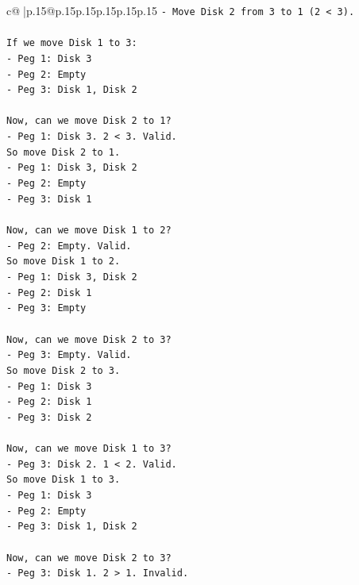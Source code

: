 \documentclass{article}
\begin{document}
{\begin{supertabular}{c@{$\;$}|p{.15\linewidth}@{}p{.15\linewidth}p{.15\linewidth}p{.15\linewidth}p{.15\linewidth}p{.15\linewidth}}
{{{\texttt{{-} Move Disk 2 from 3 to 1 (2 < 3).} \\
\\ 
\texttt{If we move Disk 1 to 3:} \\
\texttt{{-} Peg 1: Disk 3} \\
\texttt{{-} Peg 2: Empty} \\
\texttt{{-} Peg 3: Disk 1, Disk 2} \\
\\ 
\texttt{Now, can we move Disk 2 to 1?} \\
\texttt{{-} Peg 1: Disk 3. 2 < 3. Valid.} \\
\texttt{So move Disk 2 to 1.} \\
\texttt{{-} Peg 1: Disk 3, Disk 2} \\
\texttt{{-} Peg 2: Empty} \\
\texttt{{-} Peg 3: Disk 1} \\
\\ 
\texttt{Now, can we move Disk 1 to 2?} \\
\texttt{{-} Peg 2: Empty. Valid.} \\
\texttt{So move Disk 1 to 2.} \\
\texttt{{-} Peg 1: Disk 3, Disk 2} \\
\texttt{{-} Peg 2: Disk 1} \\
\texttt{{-} Peg 3: Empty} \\
\\ 
\texttt{Now, can we move Disk 2 to 3?} \\
\texttt{{-} Peg 3: Empty. Valid.} \\
\texttt{So move Disk 2 to 3.} \\
\texttt{{-} Peg 1: Disk 3} \\
\texttt{{-} Peg 2: Disk 1} \\
\texttt{{-} Peg 3: Disk 2} \\
\\ 
\texttt{Now, can we move Disk 1 to 3?} \\
\texttt{{-} Peg 3: Disk 2. 1 < 2. Valid.} \\
\texttt{So move Disk 1 to 3.} \\
\texttt{{-} Peg 1: Disk 3} \\
\texttt{{-} Peg 2: Empty} \\
\texttt{{-} Peg 3: Disk 1, Disk 2} \\
\\ 
\texttt{Now, can we move Disk 2 to 3?} \\
\texttt{{-} Peg 3: Disk 1. 2 > 1. Invalid.} \\
}}}
\end{supertabular}}
\end{document}
